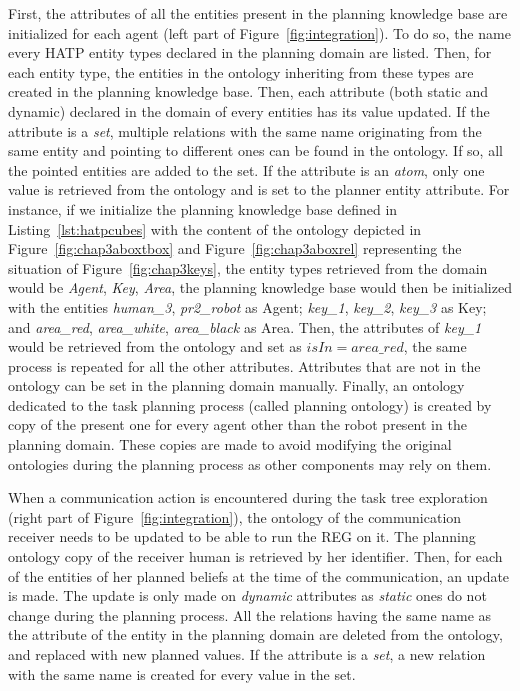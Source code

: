 \documentclass[a4paper,11pt,twoside]{StyleThese}
\begin{document}
First, the attributes of all the entities present in the planning knowledge base are initialized for each agent (left part of Figure~\ref{fig:integration}). To do so, the name every HATP entity types declared in the planning domain are listed. Then, for each entity type, the entities in the ontology inheriting from these types are created in the planning knowledge base. Then, each attribute (both static and dynamic) declared in the domain of every entities has its value updated. If the attribute is a \textit{set}, multiple relations with the same name originating from the same entity and pointing to different ones can be found in the ontology. If so, all the pointed entities are added to the set. If the attribute is an \textit{atom}, only one value is retrieved from the ontology and is set to the planner entity attribute. For instance, if we initialize the planning knowledge base defined in Listing~\ref{lst:hatpcubes} with the content of the ontology depicted in Figure~\ref{fig:chap3aboxtbox} and Figure~\ref{fig:chap3aboxrel} representing the situation of Figure~\ref{fig:chap3keys}, the entity types retrieved from the domain would be \textit{Agent}, \textit{Key}, \textit{Area}, the planning knowledge base would then be initialized with the entities \textit{human\_3}, \textit{pr2\_robot} as Agent; \textit{key\_1}, \textit{key\_2}, \textit{key\_3} as Key; and \textit{area\_red}, \textit{area\_white}, \textit{area\_black} as Area. Then, the attributes of \textit{key\_1} would be retrieved from the ontology and set as $isIn = area\_red$, the same process is repeated for all the other attributes. Attributes that are not in the ontology can be set in the planning domain manually.
Finally, an ontology dedicated to the task planning process (called planning ontology) is created by copy of the present one for every agent other than the robot present in the planning domain. These copies are made to avoid modifying the original ontologies during the planning process as other components may rely on them.


When a communication action is encountered during the task tree exploration (right part of Figure~\ref{fig:integration}), the ontology of the communication receiver needs to be updated to be able to run the REG on it.
The planning ontology copy of the receiver human is retrieved by her identifier. Then, for each of the entities of her planned beliefs at the time of the communication, an update is made. The update is only made on \textit{dynamic} attributes as \textit{static} ones do not change during the planning process. All the relations having the same name as the attribute of the entity in the planning domain are deleted from the ontology, and replaced with new planned values. If the attribute is a \textit{set}, a new relation with the same name is created for every value in the set.
\end{document}
